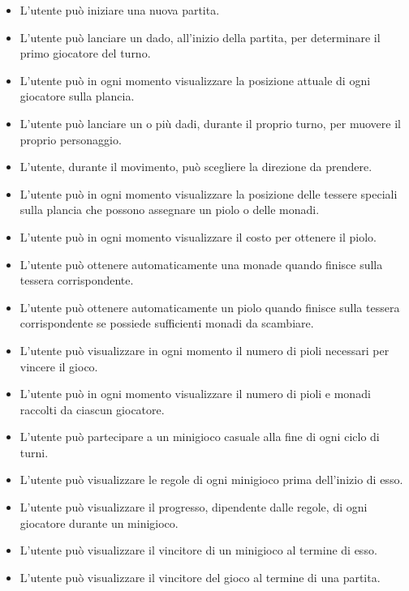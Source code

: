 \begin{itemize}
      \item L'utente può iniziare una nuova partita.
      \item L'utente può lanciare un dado, all'inizio della partita, per determinare il 
            primo giocatore del turno.
      \item L'utente può in ogni momento visualizzare la posizione attuale di ogni giocatore
            sulla plancia.
      \item L'utente può lanciare un o più dadi, durante il proprio turno, per muovere il proprio
            personaggio.
      \item L'utente, durante il movimento, può scegliere la direzione da prendere.
      \item L'utente può in ogni momento visualizzare la posizione delle tessere speciali sulla
            plancia che possono assegnare un piolo o delle monadi.
      \item L'utente può in ogni momento visualizzare il costo per ottenere il piolo.
      \item L'utente può ottenere automaticamente una monade quando finisce sulla tessera 
            corrispondente.
      \item L'utente può ottenere automaticamente un piolo quando finisce sulla tessera 
            corrispondente se possiede sufficienti monadi da scambiare.
      \item L'utente può visualizzare in ogni momento il numero di pioli necessari per vincere il gioco.
      \item L'utente può in ogni momento visualizzare il numero di pioli e monadi raccolti 
            da ciascun giocatore.
      \item L'utente può partecipare a un minigioco casuale alla fine di ogni ciclo di turni.
      \item L'utente può visualizzare le regole di ogni minigioco prima dell'inizio di esso.
      \item L'utente può visualizzare il progresso, dipendente dalle regole, di ogni giocatore
            durante un minigioco.
      \item L'utente può visualizzare il vincitore di un minigioco al termine di esso.
      \item L'utente può visualizzare il vincitore del gioco al termine di una partita.
\end{itemize}

